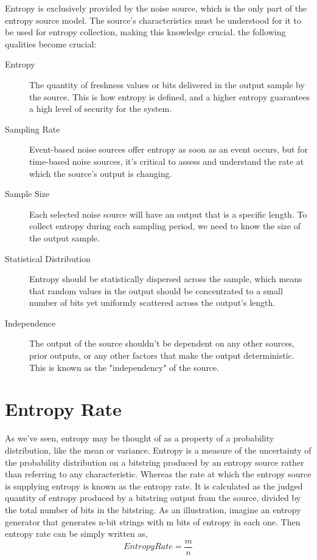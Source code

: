 Entropy is exclusively provided by the noise source, which is the only part of the entropy source model. The source's characteristics must be understood for it to be used for entropy collection, making this knowledge crucial. the following qualities become crucial:
\begin{description}
	\item[Entropy] The quantity of freshness values or bits delivered in the output sample by the source. This is how entropy is defined, and a higher entropy guarantees a high level of security for the system.
	\item[Sampling Rate] Event-based noise sources offer entropy as soon as an event occurs, but for time-based noise sources, it's critical to assess and understand the rate at which the source's output is changing. 
	\item[Sample Size] Each selected noise source will have an output that is a specific length. To collect entropy during each sampling period, we need to know the size of the output sample.
	\item[Statistical Distribution] Entropy should be statistically dispersed across the sample, which means that random values in the output should be concentrated to a small number of bits yet uniformly scattered across the output's length.
	\item[Independence] The output of the source shouldn't be dependent on any other sources, prior outputs, or any other factors that make the output deterministic. This is known as the "independency" of the source.
\end{description}

%
%
\section{Entropy Rate}
\label{sec:fundamentals:entropyrate}
As we've seen, entropy may be thought of as a property of a probability distribution, like the mean or variance. Entropy is a measure of the uncertainty of the probability distribution on a bitstring produced by an entropy source rather than referring to any characteristic. Whereas the rate at which the entropy source is supplying entropy is known as the entropy rate. It is calculated as the judged quantity of entropy produced by a bitstring output from the source, divided by the total number of bits in the bitstring.
As an illustration, imagine an entropy generator that generates n-bit strings with m bits of entropy in each one. Then entropy rate can be simply written as,
\begin{equation*}
Entropy Rate = \frac{m}{n}
\end{equation*}


